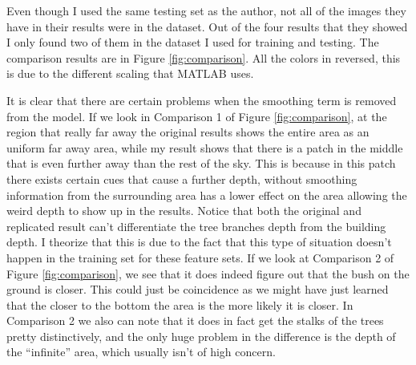 \documentclass[journal]{IEEEtran}
\begin{document}
Even though I used the same testing set as the author, not all of the images they have in their results were in the dataset. Out of the four results that they showed I only found two of them in the dataset I used for training and testing. The comparison results are in Figure \ref{fig:comparison}. All the colors in reversed, this is due to the different scaling that MATLAB uses. 

It is clear that there are certain problems when the smoothing term is removed from the model. If we look in Comparison 1 of Figure \ref{fig:comparison}, at the region that really far away the original results shows the entire area as an uniform far away area, while my result shows that there is a patch in the middle that is even further away than the rest of the sky. This is because in this patch there exists certain cues that cause a further depth, without smoothing information from the surrounding area has a lower effect on the area allowing the weird depth to show up in the results. Notice that both the original and replicated result can't differentiate the tree branches depth from the building depth. I theorize that this is due to the fact that this type of situation doesn't happen in the training set for these feature sets. If we look at Comparison 2 of Figure \ref{fig:comparison}, we see that it does indeed figure out that the bush on the ground is closer. This could just be coincidence as we might have just learned that the closer to the bottom the area is the more likely it is closer. In Comparison 2 we also can note that it does in fact get the stalks of the trees pretty distinctively, and the only huge problem in the difference is the depth of the ``infinite'' area, which usually isn't of high concern.
\end{document}
